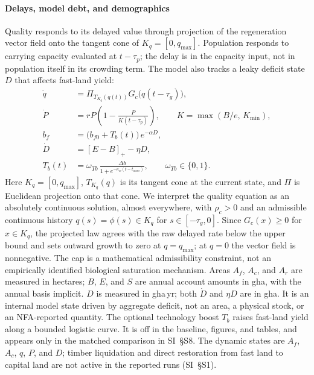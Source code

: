 \documentclass[preprint,12pt,authoryear]{elsarticle}
\newcommand{\pos}[1]{\left[#1\right]_+}
\begin{document}
\paragraph{Delays, model debt, and demographics} Quality responds to its delayed value through projection of the regeneration vector field onto the tangent cone of $K_q=[0,q_{\max}]$. Population responds to carrying capacity evaluated at $t-\tau_p$; the delay is in the capacity input, not in population itself in its crowding term. The model also tracks a leaky deficit state $D$ that affects fast-land yield:
\begin{align}
\dot q&=\Pi_{T_{K_q}(q(t))}G_c\big(q(t-\tau_g)\big),\label{eq:q}\\
\dot P&=rP\left(1-\frac{P}{K(t-\tau_p)}\right),\qquad K=\max(B/e,\,K_{\min}),\label{eq:P}\\
b_f&=\big(b_{f0}+T_b(t)\big)\,e^{-\alpha D},\label{eq:bf}\\
\dot D&=\pos{E-B}-\eta D,\label{eq:D}\\
T_b(t)&=\omega_{Tb}\,\frac{\Delta b}{1+e^{-\kappa_w(t-t_{wave})}},\qquad \omega_{Tb}\in\{0,1\}.\label{eq:Tb}
\end{align}
Here $K_q=[0,q_{\max}]$, $T_{K_q}(q)$ is its tangent cone at the current state, and $\Pi$ is Euclidean projection onto that cone. We interpret the quality equation as an absolutely continuous solution, almost everywhere, with $\rho_c>0$ and an admissible continuous history $q(s)=\phi(s)\in K_q$ for $s\in[-\tau_g,0]$. Since $G_c(x)\ge0$ for $x\in K_q$, the projected law agrees with the raw delayed rate below the upper bound and sets outward growth to zero at $q=q_{\max}$; at $q=0$ the vector field is nonnegative. The cap is a mathematical admissibility constraint, not an empirically identified biological saturation mechanism.
Areas $A_f$, $A_c$, and $A_r$ are measured in hectares; $B$, $E$, and $S$ are annual account amounts in gha, with the annual basis implicit. $D$ is measured in gha\,yr; both $\dot D$ and $\eta D$ are in gha. It is an internal model state driven by aggregate deficit, not an area, a physical stock, or an NFA-reported quantity. The optional technology boost $T_b$ raises fast-land yield along a bounded logistic curve. It is off in the baseline, figures, and tables, and appears only in the matched comparison in SI~\S S8. The dynamic states are $A_f$, $A_c$, $q$, $P$, and $D$; timber liquidation and direct restoration from fast land to capital land are not active in the reported runs (SI~\S S1).
\end{document}
